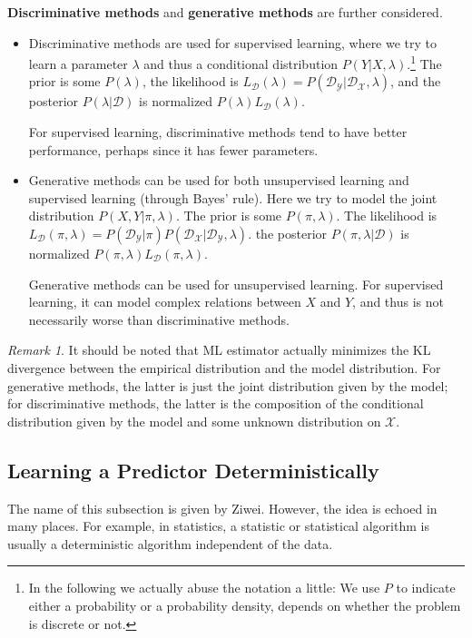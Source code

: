 \documentclass[openany]{book}
\theoremstyle{definition}
\theoremstyle{remark}
\newtheorem*{remark}{Remark}
\begin{document}
\textbf{Discriminative methods} and \textbf{generative methods} are further considered.
\begin{itemize}
    \item Discriminative methods are used for supervised learning, where we try to learn a parameter $\lambda$ and thus a conditional distribution $P(Y|X,\lambda)$.\footnote{In the following we actually abuse the notation a little: We use $P$ to indicate either a probability or a probability density, depends on whether the problem is discrete or not.} The prior is some $P(\lambda)$, the likelihood is $L_{\mathcal{D}}(\lambda)=P(\mathcal{D}_{\mathcal{Y}}|\mathcal{D}_{\mathcal{X}},\lambda)$, and the posterior $P(\lambda|\mathcal{D})$ is normalized $P(\lambda)L_{\mathcal{D}}(\lambda)$.

    For supervised learning, discriminative methods tend to have better performance, perhaps since it has fewer parameters.

    \item Generative methods can be used for both unsupervised learning and supervised learning (through Bayes' rule). Here we try to model the joint distribution $P(X,Y|\pi,\lambda)$. The prior is some $P(\pi,\lambda)$. The likelihood is $L_{\mathcal{D}}(\pi,\lambda)=P(\mathcal{D}_{\mathcal{Y}}|\pi)P(\mathcal{D}_{\mathcal{X}}|\mathcal{D}_{\mathcal{Y}},\lambda)$. the posterior $P(\pi,\lambda|\mathcal{D})$ is normalized $P(\pi,\lambda)L_{\mathcal{D}}(\pi,\lambda)$.

    Generative methods can be used for unsupervised learning. For supervised learning, it can model complex relations between $X$ and $Y$, and thus is not necessarily worse than discriminative methods.
\end{itemize}
\begin{remark}
    It should be noted that ML estimator actually minimizes the KL divergence between the empirical distribution and the model distribution. For generative methods, the latter is just the joint distribution given by the model; for discriminative methods, the latter is the composition of the conditional distribution given by the model and some unknown distribution on $\mathcal{X}$.
\end{remark}

\subsection{Learning a Predictor Deterministically}
The name of this subsection is given by Ziwei. However, the idea is echoed in many places. For example, in statistics, a statistic or statistical algorithm is usually a deterministic algorithm independent of the data.
\end{document}
